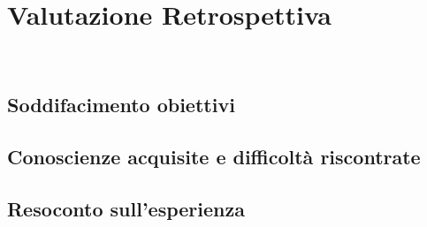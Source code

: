 
\chapter{Valutazione Retrospettiva}
\label{cap:analisi-requisiti}

\\

\section{Soddifacimento obiettivi}

\section{Conoscienze acquisite e difficoltà riscontrate}


\section{Resoconto sull'esperienza}